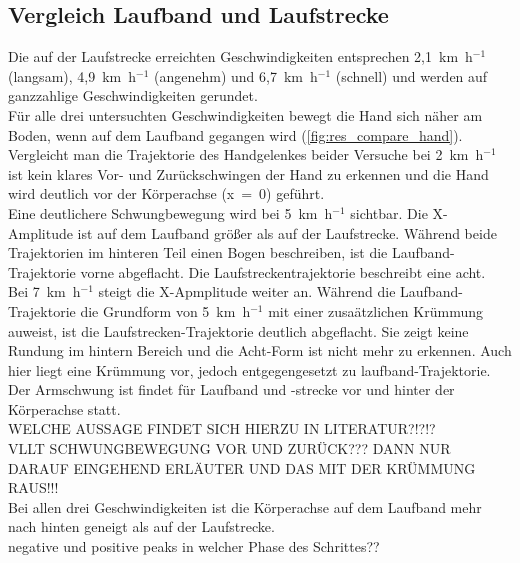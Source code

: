 \subsection{Vergleich Laufband und Laufstrecke}
Die auf der Laufstrecke erreichten Geschwindigkeiten entsprechen 2,1~km~h$^{-1}$ (langsam), 4,9~km~h$^{-1}$ (angenehm) und 6,7~km~h$^{-1}$ (schnell) und werden auf ganzzahlige Geschwindigkeiten gerundet.\\
Für alle drei untersuchten Geschwindigkeiten bewegt die Hand sich näher am Boden, wenn auf dem Laufband gegangen wird (\autoref{fig:res_compare_hand}). Vergleicht man die Trajektorie des Handgelenkes beider Versuche bei 2~km~h$^{-1}$ ist kein klares Vor- und Zurückschwingen der Hand zu erkennen und die Hand wird deutlich vor der Körperachse (x~=~0) geführt.\\
Eine deutlichere Schwungbewegung wird bei 5~km~h$^{-1}$ sichtbar. Die X-Amplitude ist auf dem Laufband größer als auf der Laufstrecke. Während beide Trajektorien im hinteren Teil einen Bogen beschreiben, ist die Laufband-Trajektorie vorne abgeflacht. Die Laufstreckentrajektorie beschreibt eine acht. \\
Bei 7~km~h$^{-1}$ steigt die X-Apmplitude weiter an. Während die Laufband-Trajektorie die Grundform von 5~km~h$^{-1}$ mit einer zusaätzlichen Krümmung auweist, ist die Laufstrecken-Trajektorie deutlich abgeflacht. Sie zeigt keine Rundung im hintern Bereich und die Acht-Form ist nicht mehr zu erkennen. Auch hier liegt eine Krümmung vor, jedoch entgegengesetzt zu laufband-Trajektorie. Der Armschwung ist findet für Laufband und -strecke vor und hinter der Körperachse statt.\\
WELCHE AUSSAGE FINDET SICH HIERZU IN LITERATUR?!?!?\\
VLLT SCHWUNGBEWEGUNG VOR UND ZURÜCK??? DANN NUR DARAUF EINGEHEND ERLÄUTER UND DAS MIT DER KRÜMMUNG RAUS!!!\\
Bei allen drei Geschwindigkeiten ist die Körperachse auf dem Laufband mehr nach hinten geneigt als auf der Laufstrecke.\\
negative und positive peaks in welcher Phase des Schrittes??\\


